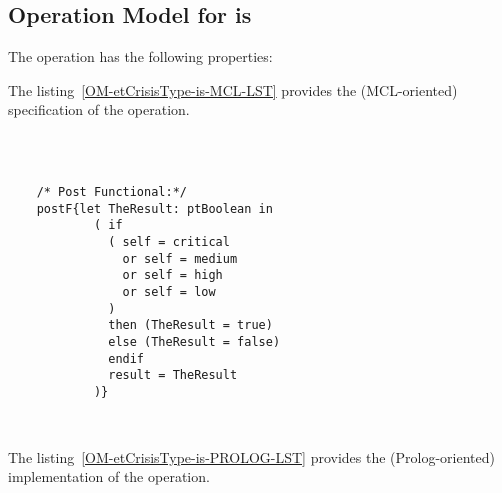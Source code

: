\subsection{Operation Model for is}

\label{OM-is}


The  operation has the following properties:

	\begin{operationmodel}



		


	\end{operationmodel}



	\vspace{1cm}
	The listing~\ref{OM-etCrisisType-is-MCL-LST} provides the \msrmessir (MCL-oriented) specification of the operation.
	
	\scriptsize
	\vspace{0.5cm}
	\begin{lstlisting}[style=MessirStyle,firstnumber=auto,captionpos=b,caption={\msrmessir (MCL-oriented) specification of the operation \emph{is}.},label=OM-etCrisisType-is-MCL-LST]

	
	
	/* Post Functional:*/ 
	postF{let TheResult: ptBoolean in
	        ( if
	          ( self = critical
	            or self = medium
	            or self = high
	            or self = low
	          )
	          then (TheResult = true)
	          else (TheResult = false)
	          endif
	          result = TheResult
	        )}
	
	
	\end{lstlisting}
	\normalsize 
	
	
	
	
	
	\vspace{1cm}
	The listing~\ref{OM-etCrisisType-is-PROLOG-LST} provides the \msrmessir (Prolog-oriented) implementation of the operation.
	
	\scriptsize
	\vspace{0.5cm}
	
	
	\normalsize





